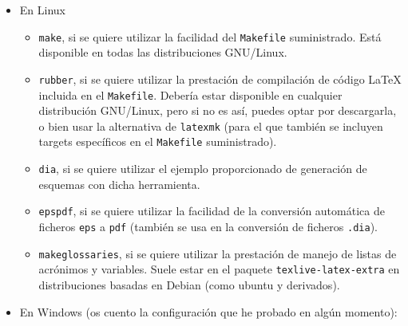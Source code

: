 \documentclass[spanish,openright]{book}
\begin{document}
\begin{itemize}
\item En Linux

\begin{itemize}
\item \texttt{make}, si se quiere utilizar la facilidad del
\texttt{Makefile} suministrado. Está disponible en todas las
distribuciones GNU/Linux.
\item \texttt{rubber}, si se quiere utilizar la prestación de
compilación de código \LaTeX{} incluida en el
\texttt{Makefile}. Debería estar disponible en cualquier distribución
GNU/Linux, pero si no es así, puedes optar por descargarla, o bien
usar la alternativa de \texttt{latexmk} (para el que también se
incluyen targets específicos en el \texttt{Makefile} suministrado).
\item \texttt{dia}, si se quiere utilizar el ejemplo proporcionado de
generación de esquemas con dicha herramienta.
\item \texttt{epspdf}, si se quiere utilizar la facilidad de la
conversión automática de ficheros \texttt{eps} a \texttt{pdf} (también
se usa en la conversión de ficheros \texttt{.dia}).
\item \texttt{makeglossaries}, si se quiere utilizar la prestación de
manejo de listas de acrónimos y variables. Suele estar en el paquete
\texttt{texlive-latex-extra} en distribuciones basadas en Debian
(como ubuntu y derivados).
\end{itemize}

\item En Windows (os cuento la configuración que he probado en algún momento):


\end{itemize}
\end{document}
